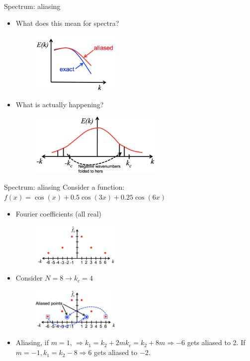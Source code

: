 \begin{frame}{Spectrum: aliasing}
\begin{itemize}
\item What does this mean for spectra?
\begin{figure}
\includegraphics[width=0.4\textwidth]{alias1.png}\\
\end{figure}
\item What is actually happening?
\begin{figure}
\includegraphics[width=0.6\textwidth]{alias2.png}	
\end{figure}
\end{itemize}
\end{frame}


\begin{frame}{Spectrum: aliasing}
Consider a function: $f(x) = \cos(x) + 0.5\cos(3x) + 0.25\cos(6x)$
\begin{itemize}
\item Fourier coefficients (all real)
\begin{figure}
\includegraphics[width=0.4\textwidth]{alias3.png}\\
\end{figure}
\item Consider $N=8 \rightarrow k_c=4$
\begin{figure}
\includegraphics[width=0.4\textwidth]{alias4.png}	
\end{figure}
\item Aliasing, if $m=1$, $\Rightarrow k_1 = k_2 + 2mk_c = k_2 + 8m \Rightarrow -6$ gets aliased to 2. If $m=-1, k_1 = k_2-8 \Rightarrow 6$ gets aliased to $-2$.
\end{itemize}
\end{frame}

